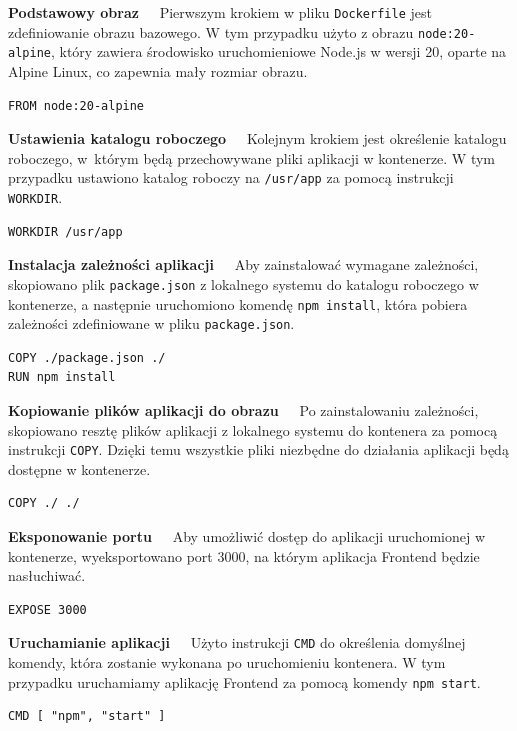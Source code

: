 \noindent \textbf{Podstawowy obraz~~}
Pierwszym krokiem w pliku \texttt{Dockerfile} jest zdefiniowanie obrazu bazowego. W tym przypadku użyto z obrazu \texttt{node:20-alpine}, który zawiera środowisko uruchomieniowe Node.js w wersji 20, oparte na Alpine Linux, co zapewnia mały rozmiar obrazu.
\begin{lstlisting}[basicstyle=\footnotesize\ttfamily]
FROM node:20-alpine
\end{lstlisting}

\noindent \textbf{Ustawienia katalogu roboczego~~}
Kolejnym krokiem jest określenie katalogu roboczego, w~którym będą przechowywane pliki aplikacji w kontenerze. W tym przypadku ustawiono katalog roboczy na \texttt{/usr/app} za pomocą instrukcji \texttt{WORKDIR}.
\begin{lstlisting}[basicstyle=\footnotesize\ttfamily]
WORKDIR /usr/app
\end{lstlisting}

\noindent \textbf{Instalacja zależności aplikacji~~}
Aby zainstalować wymagane zależności, skopiowano plik \texttt{package.json} z lokalnego systemu do katalogu roboczego w kontenerze, a następnie uruchomiono komendę \texttt{npm install}, która pobiera zależności zdefiniowane w pliku \texttt{package.json}.
\begin{lstlisting}[basicstyle=\footnotesize\ttfamily]
COPY ./package.json ./
RUN npm install
\end{lstlisting}

\noindent \textbf{Kopiowanie plików aplikacji do obrazu~~}
Po zainstalowaniu zależności, skopiowano resztę plików aplikacji z lokalnego systemu do kontenera za pomocą instrukcji \texttt{COPY}. Dzięki temu wszystkie pliki niezbędne do działania aplikacji będą dostępne w kontenerze.
\begin{lstlisting}[basicstyle=\footnotesize\ttfamily]
COPY ./ ./
\end{lstlisting}

\noindent \textbf{Eksponowanie portu~~}
Aby umożliwić dostęp do aplikacji uruchomionej w kontenerze, wyeksportowano port 3000, na którym aplikacja Frontend będzie nasłuchiwać.
\begin{lstlisting}[basicstyle=\footnotesize\ttfamily]
EXPOSE 3000
\end{lstlisting}

\noindent \textbf{Uruchamianie aplikacji~~}
Użyto instrukcji \texttt{CMD} do określenia domyślnej komendy, która zostanie wykonana po uruchomieniu kontenera. W tym przypadku uruchamiamy aplikację Frontend za pomocą komendy \texttt{npm start}.
\begin{lstlisting}[basicstyle=\footnotesize\ttfamily]
CMD [ "npm", "start" ]
\end{lstlisting}

